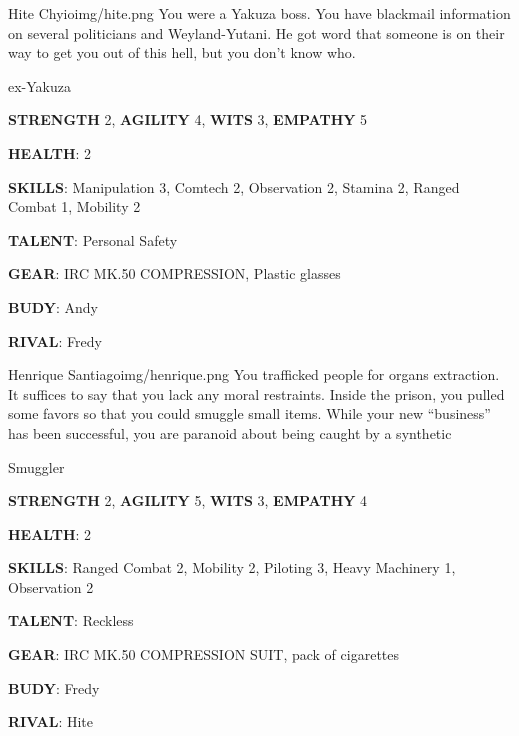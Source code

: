\newsect

\begin{rpg-pcbox}{Hite Chyio}{img/hite.png}
    You were a Yakuza boss. You have blackmail information on several politicians and Weyland-Yutani. He got word that someone is on their way to get you out of this hell, but you don't know who. 
\end{rpg-pcbox}

\begin{rpg-commentbox}{}
    ex-Yakuza

    \textbf{STRENGTH} 2, \textbf{AGILITY} 4, \textbf{WITS} 3, \textbf{EMPATHY} 5

    \textbf{HEALTH}: 2

    \textbf{SKILLS}: Manipulation 3, Comtech 2, Observation 2, Stamina 2, Ranged Combat 1, Mobility 2
    
    \textbf{TALENT}: Personal Safety
    
    \textbf{GEAR}: IRC MK.50 COMPRESSION, Plastic glasses
    
    \textbf{BUDY}: Andy
    
    \textbf{RIVAL}: Fredy
\end{rpg-commentbox}


\newsect

\medskip \medskip \medskip \medskip \medskip  \medskip \medskip \medskip \medskip \medskip \medskip \medskip \medskip \medskip \medskip  \medskip \medskip \medskip \medskip \medskip 

\begin{rpg-pcbox}{Henrique Santiago}{img/henrique.png}
    You trafficked people for organs extraction. It suffices to say that you lack any moral restraints.
    Inside the prison, you pulled some favors so that you could smuggle small items. While your new ``business'' has been successful, you are paranoid about being caught by a synthetic
\end{rpg-pcbox}

\begin{rpg-commentbox}{}
    Smuggler

    \textbf{STRENGTH} 2, \textbf{AGILITY} 5, \textbf{WITS} 3, \textbf{EMPATHY} 4

    \textbf{HEALTH}: 2

    \textbf{SKILLS}: Ranged Combat 2, Mobility 2, Piloting 3, Heavy Machinery 1, Observation 2
    
    \textbf{TALENT}: Reckless
    
    \textbf{GEAR}: IRC MK.50 COMPRESSION SUIT, pack of cigarettes

    \textbf{BUDY}: Fredy
    
    \textbf{RIVAL}: Hite
\end{rpg-commentbox}

